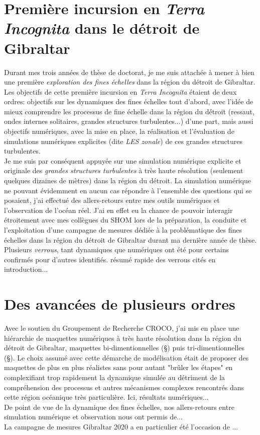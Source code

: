 
\color{blue}
\section{Première incursion en \textit{Terra Incognita} dans le détroit de Gibraltar}
Durant mes trois années de thèse de doctorat, je me suis attachée à mener à bien une première \textit{exploration des fines échelles} dans la région du détroit de Gibraltar. Les objectifs de cette première incursion en \textit{Terra Incognita} étaient de deux ordres:
objectifs sur les dynamiques des fines échelles tout d'abord, avec l'idée de mieux comprendre les processus de fine échelle dans la région du détroit (ressaut, ondes internes solitaires, grandes structures turbulentes...) d'une part, mais aussi objectifs numériques, avec la mise en place, la réalisation et l'évaluation de simulations numériques explicites (dite \textit{LES zonale}) de ces grandes structures turbulentes.\\
Je me suis par conséquent appuyée sur une simulation numérique explicite et originale des \textit{grandes structures turbulentes} à très haute résolution (seulement quelques dizaines de mètres) dans la région du détroit. La simulation numérique ne pouvant évidemment en aucun cas répondre à l'ensemble des questions qui se posaient, j'ai effectué des allers-retours entre mes outils numériques et l'observation de l'océan réel. J'ai en effet eu la chance de pouvoir interagir étroitement avec mes collègues du SHOM lors de la préparation, la conduite et l'exploitation d'une campagne de mesures dédiée à la problématique des fines échelles dans la région du détroit de Gibraltar durant ma dernière année de thèse.\\
Plusieurs \textit{verrous}, tant dynamiques que numériques ont été pour certains confirmés pour d'autres identifiés. 
\color{red} résumé rapide des verrous cités en introduction... \color{blue}\\

\section{Des avancées de plusieurs ordres}
Avec le soutien du Groupement de Recherche CROCO, j'ai mis en place une hiérarchie de maquettes numériques à très haute résolution dans la région du détroit de Gibraltar, maquettes bi-dimentionnelles (\S ) puis tri-dimentionnelles (\S ). Le choix assumé avec cette démarche de modélisation était de proposer des maquettes de plus en plus réalistes sans pour autant "brûler les étapes" en complexifiant trop rapidement la dynamique simulée au détriment de la compréhension des processus et autres mécanismes complexes rencontrés dans cette région océanique très particulière. \color{red} Ici, résultats numériques...\\
De point de vue de la dynamique des fines échelles, nos allers-retours entre simulation numérique et observation nous ont permis de...\\
La campagne de mesures Gibraltar 2020 a en particulier été l'occasion de ...\\
\color{black}

